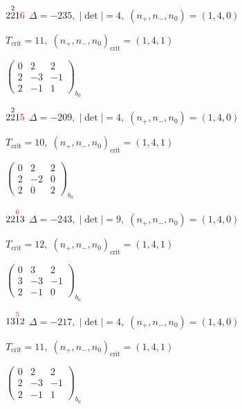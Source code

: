 \documentclass[10pt]{article}
\begin{document}
$2\overset{2}{2}1\textcolor{red}{6}$ \quad $\Delta=-235,\; |\det|=4,\; (n_+,n_-,n_0)=(1,4,0)$

\hspace{1em}$T_{\text{crit}}=11,\; (n_+,n_-,n_0)_{\text{crit}}=(1,4,1)$

\hspace{2em}$\left(\begin{smallmatrix}0 & 2 & 2 \\ 2 & -3 & -1 \\ 2 & -1 & 1\end{smallmatrix}\right)_{\!b_0}$

$2\overset{2}{2}1\textcolor{red}{5}$ \quad $\Delta=-209,\; |\det|=4,\; (n_+,n_-,n_0)=(1,4,0)$

\hspace{1em}$T_{\text{crit}}=10,\; (n_+,n_-,n_0)_{\text{crit}}=(1,4,1)$

\hspace{2em}$\left(\begin{smallmatrix}0 & 2 & 2 \\ 2 & -2 & 0 \\ 2 & 0 & 2\end{smallmatrix}\right)_{\!b_0}$

\smallskip

$22\overset{\textcolor{red}{6}}{1}3$ \quad $\Delta=-243,\; |\det|=9,\; (n_+,n_-,n_0)=(1,4,0)$

\hspace{1em}$T_{\text{crit}}=12,\; (n_+,n_-,n_0)_{\text{crit}}=(1,4,1)$

\hspace{2em}$\left(\begin{smallmatrix}0 & 3 & 2 \\ 3 & -3 & -1 \\ 2 & -1 & 0\end{smallmatrix}\right)_{\!b_0}$

\smallskip

$13\overset{\textcolor{red}{5}}{1}2$ \quad $\Delta=-217,\; |\det|=4,\; (n_+,n_-,n_0)=(1,4,0)$

\hspace{1em}$T_{\text{crit}}=11,\; (n_+,n_-,n_0)_{\text{crit}}=(1,4,1)$

\hspace{2em}$\left(\begin{smallmatrix}0 & 2 & 2 \\ 2 & -3 & -1 \\ 2 & -1 & 1\end{smallmatrix}\right)_{\!b_0}$
\end{document}
